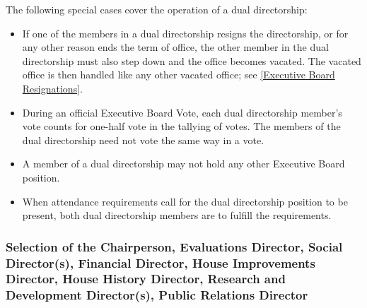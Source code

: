\documentclass{article}
\newcommand{\asubsection}[1]{\subsubsection{#1} \label{#1}}
\begin{document}
The following special cases cover the operation of a dual directorship:
\begin{itemize}
	\item If one of the members in a dual directorship resigns the directorship, or for any other reason ends the term of office, the other member in the dual directorship must also step down and the office becomes vacated.
		The vacated office is then handled like any other vacated office; see \ref{Executive Board Resignations}.
	\item During an official Executive Board Vote, each dual directorship member's vote counts for one-half vote in the tallying of votes.
		The members of the dual directorship need not vote the same way in a vote.
	\item A member of a dual directorship may not hold any other Executive Board position.
	\item When attendance requirements call for the dual directorship position to be present, both dual directorship members are to fulfill the requirements.
\end{itemize}
\asubsection{Selection of the Chairperson, Evaluations Director, Social Director(s), Financial Director, House Improvements Director, House History Director, Research and Development Director(s), Public Relations Director}
\end{document}
